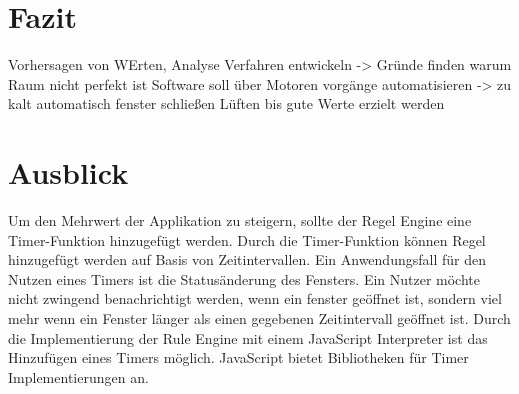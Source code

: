 \chapter{Fazit}

Vorhersagen von WErten,
Analyse Verfahren entwickeln -> Gründe finden warum Raum nicht perfekt ist
Software soll über Motoren vorgänge automatisieren -> zu kalt automatisch fenster schließen
Lüften bis gute Werte erzielt werden


\chapter{Ausblick}
Um den Mehrwert der Applikation zu steigern, sollte der Regel Engine eine Timer-Funktion hinzugefügt werden. Durch die Timer-Funktion können Regel hinzugefügt werden auf Basis von Zeitintervallen. Ein Anwendungsfall für den Nutzen eines Timers ist die Statusänderung des Fensters. Ein Nutzer möchte nicht zwingend benachrichtigt werden, wenn ein fenster geöffnet ist, sondern viel mehr wenn ein Fenster länger als einen gegebenen Zeitintervall geöffnet ist. Durch die Implementierung der Rule Engine mit einem JavaScript Interpreter ist das Hinzufügen eines Timers möglich. JavaScript bietet Bibliotheken für Timer Implementierungen an.\\